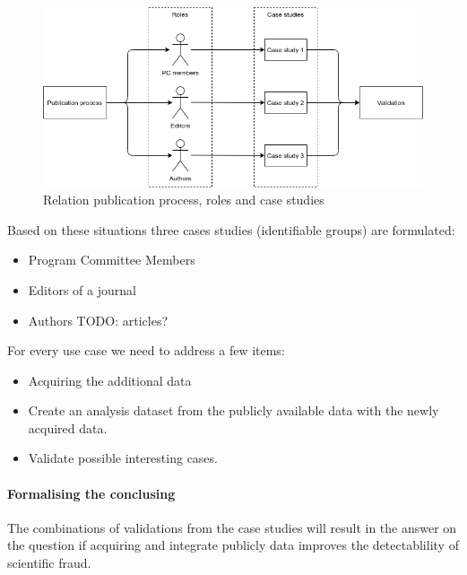 \documentclass{ou-report}
\newcommand{\todo}[1]{{\color{red} TODO: #1}}
\begin{document}
\begin{figure}[H]
\centering
\includegraphics[width=13cm]{images/research_method/research_method.png}
\caption{Relation publication process, roles and case studies}
\label{fig:research_method}
\end{figure}
Based on these situations three cases studies (identifiable groups) are formulated:
\begin{itemize}
    \item Program Committee Members
    \item Editors of a journal
    \item Authors \todo{articles?}
\end{itemize}

For every use case we need to address a few items:
\begin{itemize}
    \item Acquiring the additional data
    \item Create an analysis dataset from the publicly available data with the 
    newly acquired data.
    \item Validate possible interesting cases.
\end{itemize}



\paragraph{Formalising the conclusing}
The combinations of validations from the case studies will result in the
answer on the question if acquiring and integrate publicly data improves
the detectablility of scientific fraud.
\end{document}

